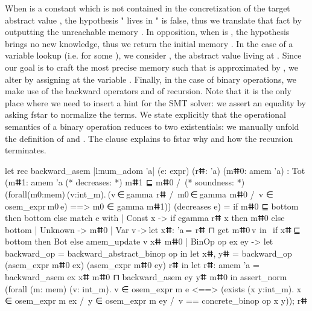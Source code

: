 \documentclass{llncs}
\begin{document}
When  is a constant which is not contained in the
concretization of the target abstract value , the
hypothesis " lives in " is false, thus we
translate that fact by outputting the unreachable memory
.
%
In opposition, when  is , the hypothesis
brings no new knowledge, thus we return the initial memory
.
%
In the case of a variable lookup (i.e.  for some
), we consider , the abstract value living at
.
%
Since our goal is to craft the most precise memory such that
 is approximated by , we alter 
by assigning  at the variable .
%
Finally, in the case of binary operations, we make use of the
backward operators and of recursion.
%
Note that it is the only place where we need to insert a hint for
the SMT solver: we assert an equality by asking \gls{fstar} to
normalize the terms.
%
We state explicitly that the operational semantics of a binary
operation reduces to two existentials: we manually unfold the
definition of  and . The
 clause explains to \gls{fstar} why and how the
recursion terminates.
%
\begin{fstarcode}
let rec backward_asem {|l:num_adom 'a|} (e: expr) (rⵌ: 'a) (mⵌ0: amem 'a)
: Tot (mⵌ1: amem 'a { (* decreases: *) mⵌ1 ⊑ mⵌ0 /\ (* soundness: *)
      (forall(m0:mem) (v:int_m). (v ∈ gamma  rⵌ /\ m0 ∈ gamma  mⵌ0 /\ v ∈ osem_expr m0 e)
                               ==> m0 ∈ gamma mⵌ1)}) (decreases e)
  = if mⵌ0 ⊑ bottom then bottom else match e with
  | Const x -> if cgamma rⵌ x then mⵌ0 else bottom | Unknown -> mⵌ0
  | Var v -> let xⵌ: 'a =  rⵌ ⊓ get  mⵌ0 v  in
            if xⵌ ⊑ bottom then Bot else amem_update v xⵌ  mⵌ0
  | BinOp op ex ey -> let backward_op = backward_abstract_binop op in
      let xⵌ, yⵌ = backward_op (asem_expr mⵌ0 ex) (asem_expr mⵌ0 ey) rⵌ in
      let rⵌ: amem 'a = backward_asem ex xⵌ mⵌ0 ⊓ backward_asem ey yⵌ mⵌ0 in
      assert_norm (forall (m: mem) (v: int_m). v ∈ osem_expr m e
        <==> (exists (x y:int_m). x ∈ osem_expr m ex /\ y ∈ osem_expr m ey
                         /\ v == concrete_binop op x y));
      rⵌ
\end{fstarcode}
%
\end{document}
